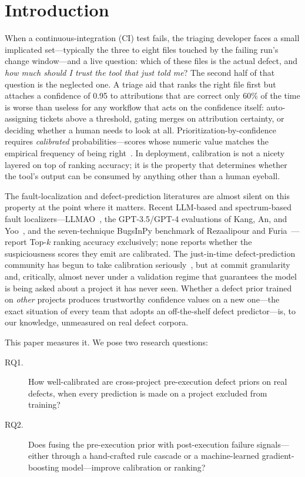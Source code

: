 \documentclass[preprint,12pt]{elsarticle}
\begin{document}
\section{Introduction}
\label{sec:intro}

When a continuous-integration (CI) test fails, the triaging developer faces a small implicated set---typically the three to eight files touched by the failing run's change window---and a live question: which of these files is the actual defect, and \emph{how much should I trust the tool that just told me}? The second half of that question is the neglected one. A triage aid that ranks the right file first but attaches a confidence of 0.95 to attributions that are correct only 60\% of the time is worse than useless for any workflow that acts on the confidence itself: auto-assigning tickets above a threshold, gating merges on attribution certainty, or deciding whether a human needs to look at all. Prioritization-by-confidence requires \emph{calibrated} probabilities---scores whose numeric value matches the empirical frequency of being right~\cite{guo2017calibration,niculescu2005predicting}. In deployment, calibration is not a nicety layered on top of ranking accuracy; it is the property that determines whether the tool's output can be consumed by anything other than a human eyeball.

The fault-localization and defect-prediction literatures are almost silent on this property at the point where it matters. Recent LLM-based and spectrum-based fault localizers---LLMAO~\cite{yang2024llmao}, the GPT-3.5/GPT-4 evaluations of Kang, An, and Yoo~\cite{kang2024llmfl}, and the seven-technique BugsInPy benchmark of Rezaalipour and Furia~\cite{rezaalipour2024pyfl}---report Top-$k$ ranking accuracy exclusively; none reports whether the suspiciousness scores they emit are calibrated. The just-in-time defect-prediction community has begun to take calibration seriously~\cite{shahini2024conformal,hong2024atlassian}, but at commit granularity and, critically, almost never under a validation regime that guarantees the model is being asked about a project it has never seen. Whether a defect prior trained on \emph{other} projects produces trustworthy confidence values on a new one---the exact situation of every team that adopts an off-the-shelf defect predictor---is, to our knowledge, unmeasured on real defect corpora.

This paper measures it. We pose two research questions:
\begin{description}
\item[RQ1.] How well-calibrated are cross-project pre-execution defect priors on real defects, when every prediction is made on a project excluded from training?
\item[RQ2.] Does fusing the pre-execution prior with post-execution failure signals---either through a hand-crafted rule cascade or a machine-learned gradient-boosting model---improve calibration or ranking?
\end{description}
\end{document}
